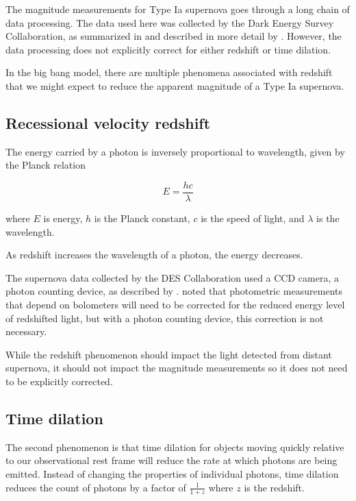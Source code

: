 \documentclass{article}
\begin{document}
The magnitude measurements for Type Ia supernova goes through a long chain of
data processing. The data used here was collected by the Dark Energy Survey
Collaboration, as summarized in \citet{abbott2024} and described in more detail
by \citet{vincenzi2024}. However, the data processing does not explicitly
correct for either redshift or time dilation.

In the big bang model, there are multiple phenomena associated with redshift that we
might expect to reduce the apparent magnitude of a Type Ia supernova.

\subsection{Recessional velocity redshift}

The energy carried by a photon is inversely proportional to wavelength, given
by the Planck relation

\begin{equation}
  E = \frac{hc}{\lambda}
\end{equation}

where $E$ is energy, $h$ is the Planck constant, $c$ is the speed of light, and
$\lambda$ is the wavelength.

As redshift increases the wavelength of a photon, the energy decreases.

The supernova data collected by the DES Collaboration used a CCD camera, a
photon counting device, as described by \citet{flaughter2015}.  \citet{kim1996}
noted that photometric measurements that depend on bolometers will need to be
corrected for the reduced energy level of redshifted light, but with a photon
counting device, this correction is not necessary.

While the redshift phenomenon should impact the light detected from distant
supernova, it should not impact the magnitude measurements so it does not need
to be explicitly corrected.

\subsection{Time dilation}

The second phenomenon is that time dilation for objects moving quickly relative
to our observational rest frame will reduce the rate at which photons are being
emitted. Instead of changing the properties of individual photons, time
dilation reduces the count of photons by a factor of $\frac{1}{1+z}$ where $z$
is the redshift.
\end{document}
